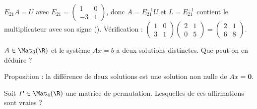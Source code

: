 \begin{qcm}
\begin{question}
\begin{explication}
$E_{21}A=U$ avec $E_{21}=\begin{pmatrix}1&0\\-3&1\end{pmatrix}$, donc $A=E_{21}^{-1}U$ et $L=E_{21}^{-1}$ contient le multiplicateur avec son signe (). Vérification : $\begin{pmatrix}1&0\\3&1\end{pmatrix}\begin{pmatrix}2&1\\0&5\end{pmatrix}=\begin{pmatrix}2&1\\6&8\end{pmatrix}$.
\end{explication}
\end{question}
\begin{question}[plusieurs]
$A\in\Mat_3(\R)$ et le système $Ax=b$ a deux solutions distinctes. Que peut-on en déduire ?
\begin{explication}
Proposition  : la différence de deux solutions est une solution non nulle de $Ax=\mathbf 0$.
\end{explication}
\end{question}
\begin{question}[plusieurs]
Soit $P\in\Mat_4(\R)$ une matrice de permutation. Lesquelles de ces affirmations sont vraies ?

\end{question}
\end{qcm}

